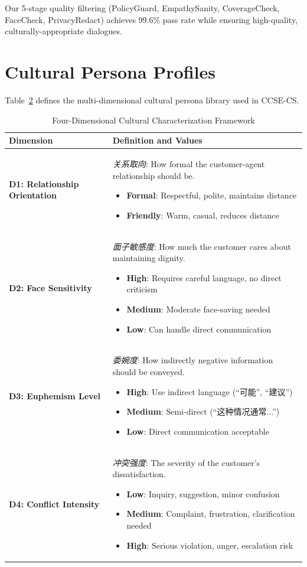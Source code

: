 \documentclass[11pt]{article}
\begin{document}
\begin{table}[t]
Our 5-stage quality filtering (PolicyGuard, EmpathySanity, CoverageCheck, FaceCheck, PrivacyRedact) achieves 99.6\% pass rate while ensuring high-quality, culturally-appropriate dialogues.

\section{Cultural Persona Profiles}

Table~\ref{tab:cultural_profiles} defines the multi-dimensional cultural persona library used in CCSE-CS.

\begin{table}[h]
\centering
\caption{Four-Dimensional Cultural Characterization Framework}
\label{tab:cultural_profiles}
\small
\begin{tabularx}{\textwidth}{l|X}
\toprule
\textbf{Dimension} & \textbf{Definition and Values} \\
\midrule
\textbf{D1: Relationship Orientation} &
\textit{关系取向}: How formal the customer-agent relationship should be.
\begin{itemize}
  \item \textbf{Formal}: Respectful, polite, maintains distance
  \item \textbf{Friendly}: Warm, casual, reduces distance
\end{itemize}
\\
\midrule
\textbf{D2: Face Sensitivity} &
\textit{面子敏感度}: How much the customer cares about maintaining dignity.
\begin{itemize}
  \item \textbf{High}: Requires careful language, no direct criticism
  \item \textbf{Medium}: Moderate face-saving needed
  \item \textbf{Low}: Can handle direct communication
\end{itemize}
\\
\midrule
\textbf{D3: Euphemism Level} &
\textit{委婉度}: How indirectly negative information should be conveyed.
\begin{itemize}
  \item \textbf{High}: Use indirect language (``可能'', ``建议'')
  \item \textbf{Medium}: Semi-direct (``这种情况通常...'')
  \item \textbf{Low}: Direct communication acceptable
\end{itemize}
\\
\midrule
\textbf{D4: Conflict Intensity} &
\textit{冲突强度}: The severity of the customer's dissatisfaction.
\begin{itemize}
  \item \textbf{Low}: Inquiry, suggestion, minor confusion
  \item \textbf{Medium}: Complaint, frustration, clarification needed
  \item \textbf{High}: Serious violation, anger, escalation risk
\end{itemize}
\\
\bottomrule
\end{tabularx}
\end{table}


\end{table}
\end{document}

